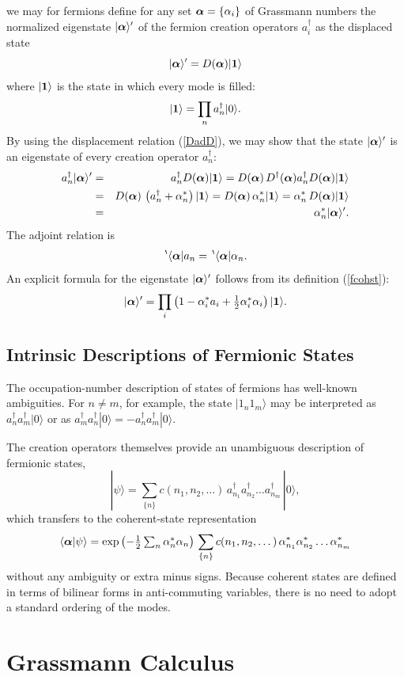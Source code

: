\documentclass[12pt]{article}
\def\beq{\begin{equation}}
\def\eeq{\end{equation}}
\def\bea{\begin{eqnarray}}
\def\eea{\end{eqnarray}}
\def\bone{{\mbox{\boldmath$1$}}}
\def\a{\alpha}
\def\ba{{\mbox{\boldmath$\alpha$}}}
\def\sa{\alpha^*}
\def\ad{a^\dgr}
\def\nn{\nonumber}
\def\dgr{\dagger}
\def\thalf{\textstyle{ {1 \over 2} } }
\def\eis{eigenstate }
\def\op{operator }
\def\cre{creation }
\begin{document}
we may for fermions define
for any set $ \ba = \{ \a_i \} $ of Grassmann numbers
the normalized \eis $ | \ba \rangle^\prime $
of the fermion creation operators $ \ad_i $
as the displaced state
\beq
| \ba \rangle^\prime = D( \ba ) | \bone \rangle
\label {fcohst}
\eeq
where $ | \bone \rangle $
is the state in which every mode is filled:
\beq
| \bone \rangle = \prod_n \ad_n | 0 \rangle .
\label {1}
\eeq
By using the displacement relation (\ref {DadD}),
we may  show that the state $ | \ba \rangle^\prime $
is an \eis of every \cre \op $ \ad_n $:
\bea
\ad_n | \ba \rangle^\prime & = & \ad_n D( \ba ) | \bone \rangle
= D( \ba ) \, D^\dgr( \ba ) \ad_n D( \ba ) | \bone \rangle \nn\\
& = & D( \ba ) \, \left( \ad_n + \sa_n \right) | \bone \rangle
=  D( \ba ) \, \sa_n | \bone \rangle
= \sa_n \, D( \ba ) | \bone \rangle \nn\\
& = & \sa_n | \ba \rangle^\prime .
\label {fseig}
\eea
The adjoint relation is
\beq
\, ^\backprime\langle \ba | a_n = \, ^\backprime\langle \ba | \a_n .
\label {adfseig}
\eeq
An explicit formula for the \eis $ | \ba \rangle^\prime $
follows from its definition (\ref {fcohst}):
\beq
| \ba \rangle^\prime = \prod_i 
\left( 1 - \sa_i a_i + \thalf \sa_i \a_i \right)
| \bone \rangle .
\label {expfcohst}
\eeq
 
\subsection{Intrinsic Descriptions of Fermionic States}
The occupation-number description
of states of fermions has well-known ambiguities.
For $ n \ne m $, for example,
the state $ | 1_n 1_m \rangle $ may be interpreted
as $ \ad_n \ad_m | 0 \rangle $
or as $ \ad_m \ad_n | 0 \rangle = - \ad_n \ad_m | 0 \rangle $.
\par
The creation operators themselves provide
an unambiguous description of fermionic states,
\beq
| \psi \rangle = 
\sum_{ \{n\} } c( n_1 , n_2 , \dots ) 
\, \ad_{n_1} \ad_{n_2} \dots \ad_{n_m} 
\, | 0 \rangle ,
\label {fstate}
\eeq
which transfers to the coherent-state representation
\beq
\langle \ba | \psi \rangle =
\exp \left( - \thalf \sum_n \sa_n \a_n \right)
\, \sum_{\{n\}} c( n_1 , n_2 , \dots ) \, \sa_{n_1} \sa_{n_2} \dots \sa_{n_m} 
\label {cfstate}
\eeq 
without any ambiguity or extra minus signs.
Because coherent states are defined in terms
of bilinear forms in anti-commuting variables,
there is no need to adopt a standard ordering of the modes.
\section{Grassmann Calculus}
\end{document}
